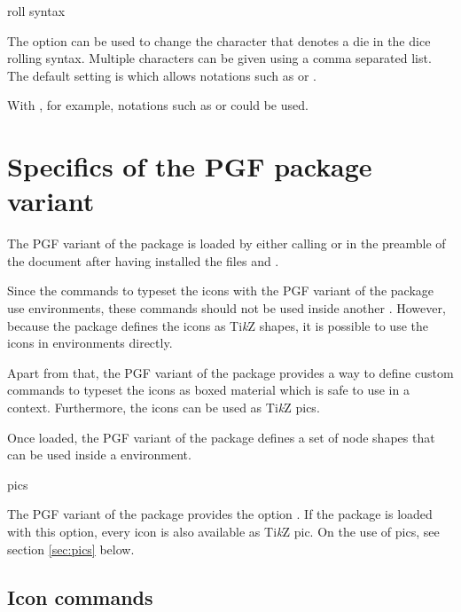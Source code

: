 \documentclass[a4paper]{article}
\begin{document}
\begin{macrodef}
roll syntax
\end{macrodef}
The option  can be used to change the character that denotes a die in the dice rolling syntax. Multiple characters can be given using a comma separated list. The default setting is  which allows notations such as  or . 

With , for example, notations such as  or  could be used. 


\RenewCommandCopy\die\rpgiconsdie
\RenewCommandCopy\ability\rpgiconsability

\section{Specifics of the PGF package variant}

The PGF variant of the package is loaded by either calling \macro{\usepackage[pgf]{rpgicons}} or \macro{\usepackage{rpgicons-pgf}} in the preamble of the document after having installed the files  and . 

Since the commands to typeset the icons with the PGF variant of the package use  environments, these commands should not be used inside another . However, because the package defines the icons as Ti\emph{k}Z shapes, it is possible to use the icons in  environments directly. 

Apart from that, the PGF variant of the package provides a way to define custom commands to typeset the icons as boxed material which is safe to use in a  context. Furthermore, the icons can be used as Ti\emph{k}Z pics. 

Once loaded, the PGF variant of the package defines a set of node shapes that can be used inside a  environment. 

\begin{macrodef}pics\end{macrodef}
The PGF variant of the package provides the option . If the package is loaded with this option, every icon is also available as Ti\emph{k}Z pic. On the use of pics, see section \ref{sec:pics} below.

\subsection{Icon commands}
\end{document}
